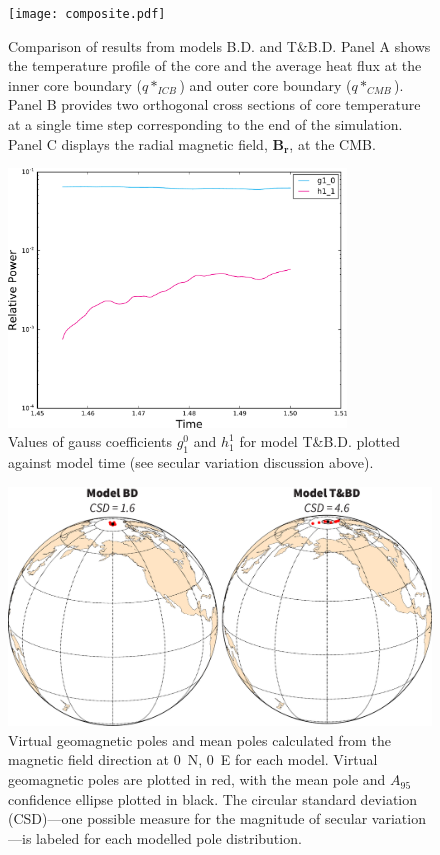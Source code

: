 \documentclass[12pt,letterpaper]{article}
\begin{document}
\begin{figure}
\centering
\texttt{[image: composite.pdf]}
\caption{\small{Comparison of results from models B.D. and T\&B.D. Panel A shows the temperature profile of the core and the average heat flux at the inner core boundary ($q*_{ICB}$) and outer core boundary ($q*_{CMB}$). Panel B provides two orthogonal cross sections of core temperature at a single time step corresponding to the end of the simulation. Panel C displays the radial magnetic field, $\mathbf{B_r}$, at the CMB.}}
\label{fig:composite}
\end{figure}

\begin{figure}
\centering
\includegraphics[width=0.8\textwidth]{gauss_coef_plot.pdf}
\caption{\small{Values of gauss coefficients $g^{0}_{1}$ and $h^{1}_{1}$ for model T\&B.D. plotted against model time (see secular variation discussion above).}}
\label{fig:source_gauss}
\end{figure}

\begin{figure}
\centering
\includegraphics[width=\textwidth]{VGPS.pdf}
\caption{\small{Virtual geomagnetic poles and mean poles calculated from the magnetic field direction at 0\textdegree\ N, 0\textdegree\ E for each model. Virtual geomagnetic poles are plotted in red, with the mean pole and $A_{95}$ confidence ellipse plotted in black. The circular standard deviation (CSD)---one possible measure for the magnitude of secular variation---is labeled for each modelled pole distribution.}}
\label{fig:vgps}
\end{figure}
\end{document}
